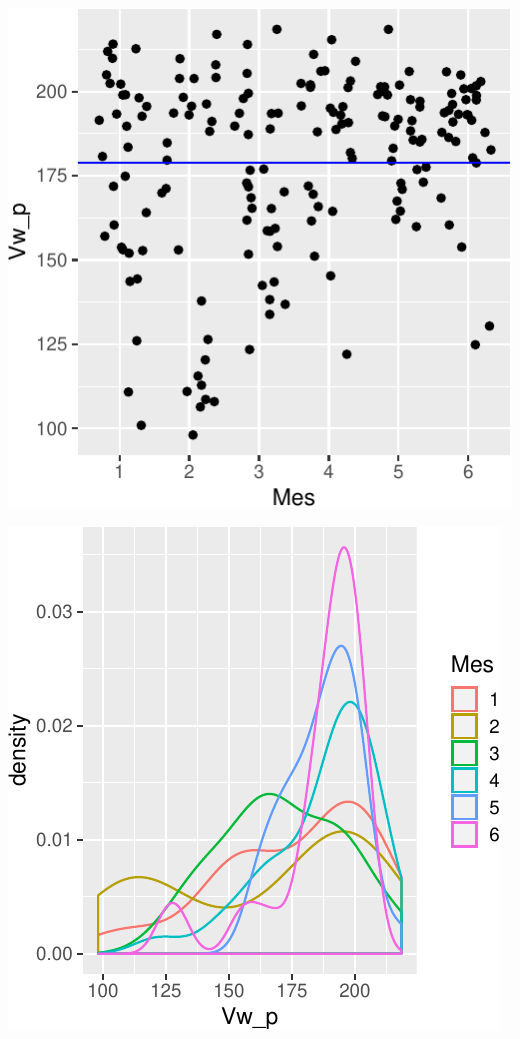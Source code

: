 \documentclass[letterpaper,9pt,twocolumn,twoside,]{pinp}
\begin{document}
\begin{center}\includegraphics{report_hidrolgy_files/figure-latex/unnamed-chunk-8-1} \end{center}

\begin{center}\includegraphics{report_hidrolgy_files/figure-latex/unnamed-chunk-9-1} \end{center}
\end{document}
